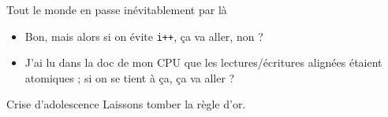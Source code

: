\documentclass[xcolor={x11names,svgnames}]{beamer}
\begin{document}

\begin{frame}[label=guru_switch]
  \begin{exampleblock}{Tout le monde en passe inévitablement par là}
    \begin{itemize}
    \item Bon, mais alors si on évite \texttt{i++}, ça va aller, non ?
    \item J'ai lu dans la doc de mon CPU que les lectures/écritures alignées étaient atomiques ; si on se tient à ça, ça va aller ?
    \end{itemize}
  \end{exampleblock}

  \pause\bigskip
  \begin{alertblock}{Crise d'adolescence}
    Laissons tomber la règle d'or.
  \end{alertblock}

  \pause\bigskip
  
  
\end{frame}    

\end{document}
